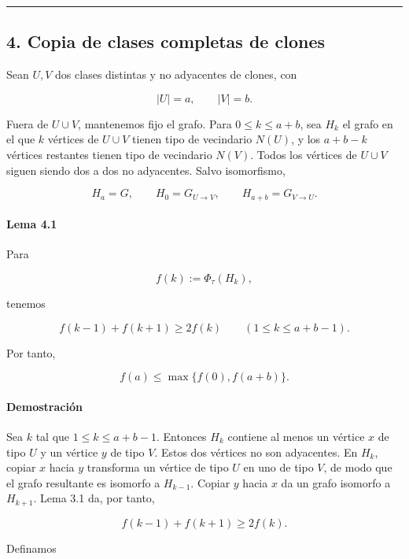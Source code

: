 \documentclass[spanish,11pt,a4paper]{article}
\begin{document}
\begin{center}\rule{0.5\linewidth}{0.5pt}\end{center}

\subsection{4. Copia de clases completas de
clones}\label{copia-de-clases-completas-de-clones}

Sean \(U,V\) dos clases distintas y no adyacentes de clones, con

\[
|U|=a,
\qquad
|V|=b.
\]

Fuera de \(U\cup V\), mantenemos fijo el grafo. Para \(0\le k\le a+b\),
sea \(H_k\) el grafo en el que \(k\) vértices de \(U\cup V\) tienen tipo
de vecindario \(N(U)\), y los \(a+b-k\) vértices restantes tienen tipo
de vecindario \(N(V)\). Todos los vértices de \(U\cup V\) siguen siendo
dos a dos no adyacentes. Salvo isomorfismo,

\[
H_a=G,
\qquad
H_0=G_{U\to V},
\qquad
H_{a+b}=G_{V\to U}.
\]

\paragraph{Lema 4.1}\label{lema-4.1}

Para

\[
f(k):=\Phi_\tau(H_k),
\]

tenemos

\[
f(k-1)+f(k+1)\ge2f(k)
\qquad
(1\le k\le a+b-1).
\]

Por tanto,

\[
f(a)\le\max\{f(0),f(a+b)\}.
\]

\paragraph{Demostración}\label{demostraciuxf3n-2}

Sea \(k\) tal que \(1\le k\le a+b-1\). Entonces \(H_k\) contiene al
menos un vértice \(x\) de tipo \(U\) y un vértice \(y\) de tipo \(V\).
Estos dos vértices no son adyacentes. En \(H_k\), copiar \(x\) hacia
\(y\) transforma un vértice de tipo \(U\) en uno de tipo \(V\), de modo
que el grafo resultante es isomorfo a \(H_{k-1}\). Copiar \(y\) hacia
\(x\) da un grafo isomorfo a \(H_{k+1}\). Lema 3.1 da, por tanto,

\[
f(k-1)+f(k+1)\ge2f(k).
\]

Definamos
\end{document}
